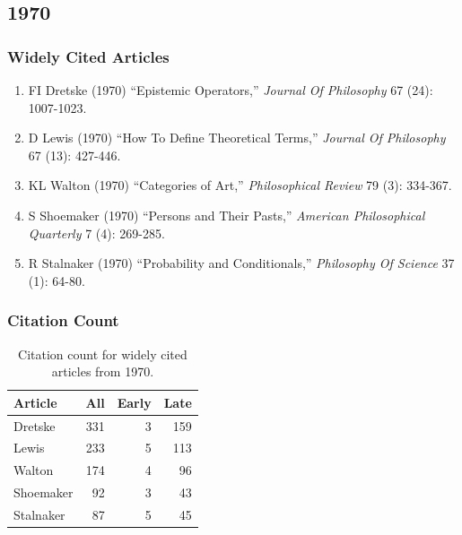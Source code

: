 \documentclass[
  10pt,
  letterpaper,
  DIV=11,
  numbers=noendperiod,
  twoside]{scrartcl}
\providecommand{\tightlist}{%
  \setlength{\itemsep}{0pt}\setlength{\parskip}{0pt}}\usepackage{longtable,booktabs,array}
\begin{document}
\newpage

\subsection{1970}\label{sec-s1970}

\subsubsection*{Widely Cited Articles}\label{widely-cited-articles-14}

\begin{enumerate}
\def\labelenumi{\arabic{enumi}.}
\tightlist
\item
  FI Dretske (1970) ``Epistemic Operators,'' \emph{Journal Of
  Philosophy} 67 (24): 1007-1023.
\item
  D Lewis (1970) ``How To Define Theoretical Terms,'' \emph{Journal Of
  Philosophy} 67 (13): 427-446.
\item
  KL Walton (1970) ``Categories of Art,'' \emph{Philosophical Review} 79
  (3): 334-367.
\item
  S Shoemaker (1970) ``Persons and Their Pasts,'' \emph{American
  Philosophical Quarterly} 7 (4): 269-285.
\item
  R Stalnaker (1970) ``Probability and Conditionals,'' \emph{Philosophy
  Of Science} 37 (1): 64-80.
\end{enumerate}

\subsubsection*{Citation Count}\label{sec-count-1970}

\begin{longtable}[]{@{}lrrr@{}}

\caption{\label{tbl-citation-count-1970}Citation count for widely cited
articles from 1970.}

\tabularnewline

\toprule\noalign{}
Article & All & Early & Late \\
\midrule\noalign{}
\endhead
\bottomrule\noalign{}
\endlastfoot
Dretske & 331 & 3 & 159 \\
Lewis & 233 & 5 & 113 \\
Walton & 174 & 4 & 96 \\
Shoemaker & 92 & 3 & 43 \\
Stalnaker & 87 & 5 & 45 \\

\end{longtable}
\end{document}
